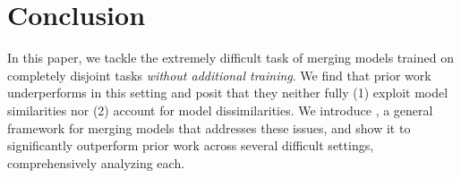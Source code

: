\section{Conclusion}
In this paper, we tackle the extremely difficult task of merging models trained on completely disjoint tasks \textit{without additional training}.
We find that prior work underperforms in this setting and posit that they neither fully (1) exploit model similarities nor (2) account for model dissimilarities.
We introduce \name{}, a general framework for merging models that addresses these issues, and show it to significantly outperform prior work across several difficult settings, comprehensively analyzing each.


